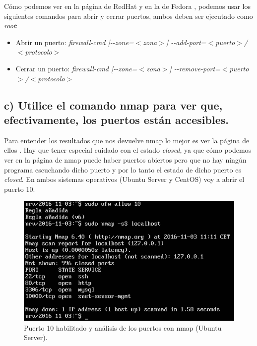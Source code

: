 \documentclass[a4paper,titlepage,12pt]{scrartcl}	%
\numberwithin{figure}{section} %
\numberwithin{table}{section} %
\begin{document}
	Cómo podemos ver en la página de RedHat \cite{firewall-cmd_puertosRH} y en la de Fedora \cite{firewall-cmd_puertosFedora}, podemos usar los siguientes comandos para abrir y cerrar puertos, ambos deben ser ejecutado como \textit{root}:
	\begin{itemize}
		\item Abrir un puerto: \textit{firewall-cmd [{-}-zone=$<$zona$>$] {-}-add-port=$<$puerto$>$/$<$protocolo$>$}
		\item Cerrar un puerto: \textit{firewall-cmd [{-}-zone=$<$zona$>$] {-}-remove-port=$<$puerto$>$/$<$protocolo$>$}
	\end{itemize}
	
	\subsection[c) Utilice el comando nmap para ver que, efectivamente, los puertos están accesibles.]{c) Utilice el comando nmap para ver que, efectivamente, los puertos están accesibles.}
	
	Para entender los resultados que nos devuelve nmap lo mejor es ver la página de ellos \cite{nmap}. Hay que tener especial cuidado con el estado \textit{closed}, ya que cómo podemos ver en la página de nmap puede haber puertos abiertos pero que no hay ningún programa escuchando dicho puerto y por lo tanto el estado de dicho puerto es \textit{closed}. En ambos sistemas operativos (Ubuntu Server y CentOS) voy a abrir el puerto 10.
	
	\begin{figure}[H]
		\centering
		\includegraphics[scale=0.82]{./Imagenes/3-nmapubuntu.png}
		\caption[Puerto 10 habilitado y análisis de los puertos con nmap (Ubuntu Server).]{Puerto 10 habilitado y análisis de los puertos con nmap (Ubuntu Server).}
		\label{3-nmapubuntu}
	\end{figure}
	
\end{document}
